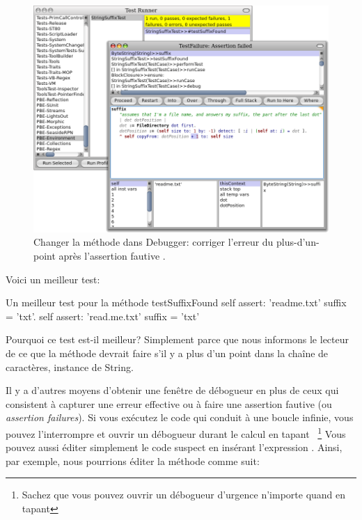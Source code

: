 \documentclass[a4paper,10pt,twoside]{book}
\begin{document}
\begin{figure}[btp]
	\begin{center}
		\includegraphics[width=\textwidth]{fixOffByOne}
	\end{center}
	\caption{Changer la méthode  dans Debugger: corriger l'erreur du plus-d'un-point après l'assertion fautive \sunit.}
\end{figure} %

Voici un meilleur test:

\begin{method}[testSuffix2]{Un meilleur test pour la méthode }
testSuffixFound
	self assert: 'readme.txt' suffix = 'txt'.
	self assert: 'read.me.txt' suffix = 'txt'
\end{method}
\noindent
Pourquoi ce test est-il meilleur? Simplement parce que
nous informons le lecteur de ce que la méthode devrait faire 
s'il y a plus d'un point dans la chaîne de caractères, instance de String.

Il y a d'autres moyens d'obtenir une fenêtre de débogueur en plus de ceux
qui consistent à capturer une erreur effective ou à faire une assertion
fautive (ou \emph{assertion failures}).
Si vous exécutez le code qui conduit à une boucle infinie, vous pouvez
l'interrompre et ouvrir un débogueur durant le calcul en tapant %
~\footnote{Sachez que vous pouvez ouvrir un débogueur d'urgence n'importe quand en tapant
}
Vous pouvez aussi éditer simplement le code suspect en insérant l'expression .
Ainsi, par exemple, nous pourrions éditer la méthode  comme suit:
\end{document}
